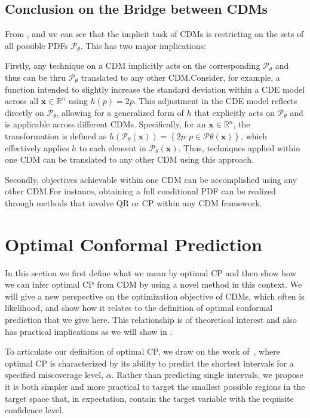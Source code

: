 \subsection{Conclusion on the Bridge between CDMs}

From ,  and  we can see that the implicit task of CDMs is restricting on the sets of all possible PDFs $\mathscr{P}_\theta$. This has two major implications:

Firstly, any technique on a CDM implicitly acts on the corresponding $\mathscr{P}_\theta$ and thus can be thru $\mathscr{P}_\theta$ translated to any other CDM.\@ Consider, for example, a function intended to slightly increase the standard deviation within a CDE model across all $\mathbf{x} \in \mathbb{R}^n$ using $h(p) = 2p$. This adjustment in the CDE model reflects directly on $\mathscr{P}_\theta$, allowing for a generalized form of $h$ that explicitly acts on $\mathscr{P}_\theta$ and is applicable across different CDMs. Specifically, for an $\mathbf{x} \in \mathbb{R}^n$, the transformation is defined as $h(\mathscr{P}_{\theta}(\mathbf{x})) = \left\{2 p: p \in \mathscr{P}\theta(\mathbf{x}) \right\}$, which effectively applies $h$ to each element in $\mathscr{P}_\theta(\mathbf{x})$. Thus, techniques applied within one CDM can be translated to any other CDM using this approach.

Secondly, objectives achievable within one CDM can be accomplished using any other CDM.\@ For instance, obtaining a full conditional PDF can be realized through methods that involve QR or CP within any CDM framework.

\section{Optimal Conformal Prediction}\label{sec:optimal_cp}

In this section we first define what we mean by optimal CP and then show how we can infer optimal CP from CDM by using a novel method in this context. We will give a new perspective on the optimization objective of CDMs, which often is likelihood, and show how it relates to the definition of optimal conformal prediction that we give here. This relationship is of theoretical interest and also has practical implications as we will show in .

To articulate our definition of optimal CP, we draw on the work of~\cite{sesia2021conformal}, where optimal CP is characterized by its ability to predict the shortest intervals for a specified miscoverage level, $\alpha$. Rather than predicting single intervals, we propose it is both simpler and more practical to target the smallest possible regions in the target space that, in expectation, contain the target variable with the requisite confidence level.

